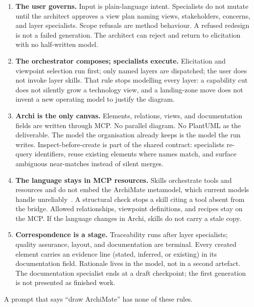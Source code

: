 \documentclass[10pt,journal,compsoc]{IEEEtran}
\begin{document}
\begin{enumerate}
\item \textbf{The user governs.} Input is plain-language intent. Specialists do not mutate until the architect approves a view plan naming views, stakeholders, concerns, and layer specialists. Scope refusals are method behaviour. A refused redesign is not a failed generation. The architect can reject and return to elicitation with no half-written model.

\item \textbf{The orchestrator composes; specialists execute.} Elicitation and viewpoint selection run first; only named layers are dispatched; the user does not invoke layer skills. That rule stops modelling every layer: a capability cut does not silently grow a technology view, and a landing-zone move does not invent a new operating model to justify the diagram.

\item \textbf{Archi is the only canvas.} Elements, relations, views, and documentation fields are written through MCP. No parallel diagram. No PlantUML as the deliverable. The model the organisation already keeps is the model the run writes. Inspect-before-create is part of the shared contract: specialists re-query identifiers, reuse existing elements where names match, and surface ambiguous near-matches instead of silent merges.

\item \textbf{The language stays in MCP resources.} Skills orchestrate tools and resources and do not embed the ArchiMate metamodel, which current models handle unreliably~\cite{muff2024}. A structural check stops a skill citing a tool absent from the bridge. Allowed relationships, viewpoint definitions, and recipes stay on the MCP. If the language changes in Archi, skills do not carry a stale copy.

\item \textbf{Correspondence is a stage.} Traceability runs after layer specialists; quality assurance, layout, and documentation are terminal. Every created element carries an evidence line (stated, inferred, or existing) in its documentation field. Rationale lives in the model, not in a second artefact. The documentation specialist ends at a draft checkpoint; the first generation is not presented as finished work.
\end{enumerate}

A prompt that says ``draw ArchiMate'' has none of these rules.
\end{document}
